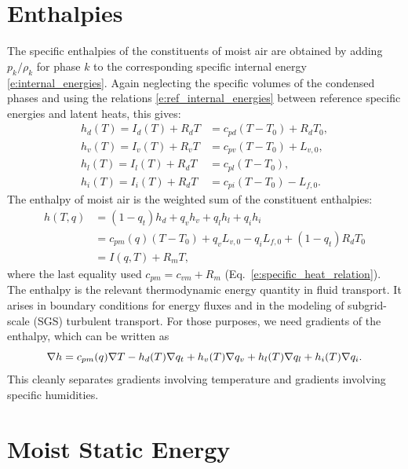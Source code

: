 \documentclass{report}
\begin{document}
\section{Enthalpies}\label{s:enthalpies}

The specific enthalpies of the constituents of moist air are obtained by adding $p_k/\rho_k$ for phase $k$ to the corresponding specific internal energy \eqref{e:internal_energies}. Again neglecting the specific volumes of the condensed phases and using the relations \eqref{e:ref_internal_energies} between reference specific energies and latent heats, this gives:
\begin{subequations}\label{e:enthalpies}
\begin{align}
    h_d(T) = I_d(T) + R_d T &= c_{pd}(T-T_0) + R_d T_0, \\
    h_v(T) = I_v(T) + R_v T &= c_{pv}(T-T_0) + L_{v,0}, \\
    h_l(T) = I_l(T) + R_d T &= c_{pl}(T-T_0), \\
    h_i(T) = I_i(T) + R_d T &= c_{pi}(T-T_0) - L_{f,0}.
\end{align}
\end{subequations}
The enthalpy of moist air is the weighted sum of the constituent enthalpies:
\begin{equation}
\begin{split}\label{e:enthalpy_definition}
    h(T, q)  &= (1-q_t) h_d + q_v h_v + q_l h_l + q_i h_i \\
        &= c_{pm}(q) (T-T_0) + q_v L_{v,0} - q_i L_{f,0} + (1-q_t) R_d T_0\\
        &= I(q, T) + R_m T,
\end{split}
\end{equation}
where the last equality used $c_{pm} = c_{vm} + R_m$ (Eq.~\ref{e:specific_heat_relation}). The enthalpy is the relevant thermodynamic energy quantity in fluid transport. It arises in boundary conditions for energy fluxes and in the modeling of subgrid-scale (SGS) turbulent transport. For those purposes, we need gradients of the enthalpy, which can be written as 
\begin{equation}\label{e:enthalpy_gradient}
    \nabla h = c_{pm}(q) \nabla T - h_d(T) \nabla q_t
    + h_v(T) \nabla q_v + h_l(T) \nabla q_l + h_i(T) \nabla q_i.
\end{equation}
This cleanly separates gradients involving temperature and gradients involving specific humidities.

\section{Moist Static Energy}
\end{document}

